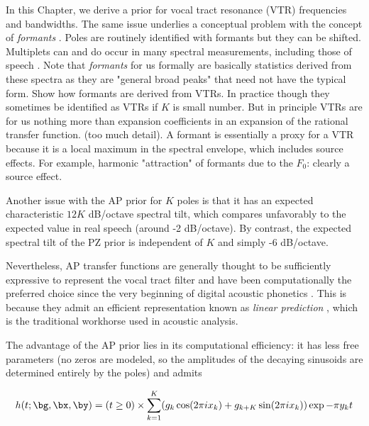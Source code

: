 \begin{chaptersections}{%
In this Chapter, we derive a prior for vocal tract resonance (VTR) frequencies and bandwidths.
}
The same issue underlies a conceptual problem with the concept of \emph{formants} \citep{Whalen2022}.
Poles are routinely identified with formants but they can be shifted.
Multiplets can and do occur in many spectral measurements, including those of speech \citep{VanSoom2021}.
Note that \emph{formants} for us formally are basically statistics derived from these spectra as they are "general broad peaks" that need not have the typical form.
Show how formants are derived from VTRs.
In practice though they sometimes be identified as VTRs if $K$ is small number.
But in principle VTRs are for us nothing more than expansion coefficients in an expansion of the rational transfer function.
(too much detail).
A formant is essentially a proxy for a VTR because it is a local maximum in the spectral envelope, which includes source effects.
For example, harmonic "attraction" of formants due to the $F_0$: clearly a source effect. \citep{Whalen2022}

Another issue with the AP prior for $K$ poles is that it has an expected characteristic $12K$ dB/octave spectral tilt, which compares unfavorably to the expected value in real speech (around -2 dB/octave).
By contrast, the expected spectral tilt of the PZ prior is independent of $K$ and simply -6 dB/octave.

Nevertheless, AP transfer functions are generally thought to be sufficiently expressive to represent the vocal tract filter  \citep{Flanagan1965,Fulop2011} and have been computationally the preferred choice since the very beginning of digital acoustic phonetics \citep{Atal1971}.
This is because they admit an efficient representation known as \emph{linear prediction} \citep{Markel1976}, which is the traditional workhorse used in acoustic analysis.

The advantage of the AP prior lies in its computational efficiency: it has less free parameters (no zeros are modeled, so the amplitudes of the decaying sinusoids are determined entirely by the poles) and admits 


\begin{equation}
h(t; \bg, \bx, \by) = (t \geq 0) \times \sum_{k=1}^K (g_k \cos(2\pi i x_k) + g_{k+K} \sin(2\pi i x_k)) \exp{-\pi y_k t} \label{eq:hparam}
\end{equation}


\end{chaptersections}
